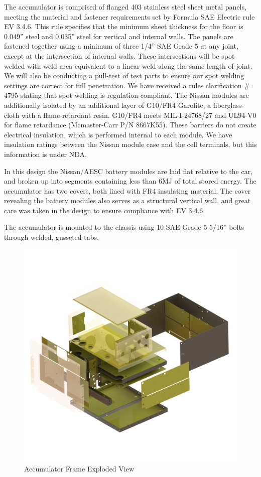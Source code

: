 \documentclass{article}
\begin{document}
The accumulator is comprised of flanged 403 stainless steel sheet metal panels, meeting the material and fastener requirements set by Formula SAE Electric rule EV 3.4.6. This rule specifies that the minimum sheet thickness for the floor is 0.049” steel and 0.035” steel for vertical and internal walls. The panels are fastened together using a minimum of three 1/4” SAE Grade 5 at any joint, except at the intersection of internal walls. These intersections will be spot welded with weld area equivalent to a linear weld along the same length of joint. We will also be conducting a pull-test of test parts to ensure our spot welding settings are correct for full penetration. We have received a rules clarification \# 4795 stating that spot welding is regulation-compliant. The Nissan modules are additionally isolated by an additional layer of G10/FR4 Garolite, a fiberglass-cloth with a flame-retardant resin. G10/FR4 meets MIL-I-24768/27 and UL94-V0 for flame retardance (Mcmaster-Carr P/N 8667K55). These barriers do not create electrical insulation, which is performed internal to each module. We have insulation ratings between the Nissan module case and the cell terminals, but this information is under NDA.

In this design the Nissan/AESC battery modules are laid flat relative to the car, and broken up into segments containing less than 6MJ of total stored energy. The accumulator has two covers, both lined with FR4 insulating material. The cover revealing the battery modules also serves as a structural vertical wall, and great care was taken in the design to ensure compliance with EV 3.4.6.

The accumulator is mounted to the chassis using 10 SAE Grade 5 5/16” bolts through welded, gusseted tabs.

\begin{figure}[H]
    \centering
    \includegraphics[width = 0.7 \textwidth]{accumulator_insulation_frame_isoview}
    \caption{Accumulator Frame Exploded View}
    \label{acc_frame}
\end{figure}
\end{document}
